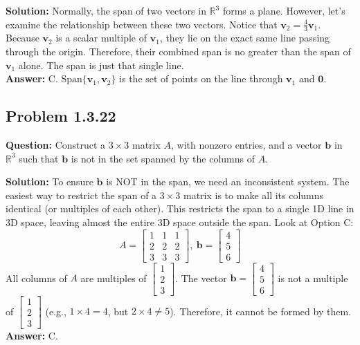 \documentclass[11pt]{article}
\begin{document}
\textbf{Solution:}
Normally, the span of two vectors in $\mathbb{R}^3$ forms a plane. However, let's examine the relationship between these two vectors.
Notice that $\mathbf{v}_2 = \frac{4}{3} \mathbf{v}_1$.
Because $\mathbf{v}_2$ is a scalar multiple of $\mathbf{v}_1$, they lie on the exact same line passing through the origin. Therefore, their combined span is no greater than the span of $\mathbf{v}_1$ alone. The span is just that single line.
\\
\textbf{Answer:} C. $\text{Span}\{\mathbf{v}_1, \mathbf{v}_2\}$ is the set of points on the line through $\mathbf{v}_1$ and $\mathbf{0}$.


\subsection*{Problem 1.3.22}
\textbf{Question:} Construct a $3 \times 3$ matrix $A$, with nonzero entries, and a vector $\mathbf{b}$ in $\mathbb{R}^3$ such that $\mathbf{b}$ is not in the set spanned by the columns of $A$.

\textbf{Solution:}
To ensure $\mathbf{b}$ is NOT in the span, we need an inconsistent system. The easiest way to restrict the span of a $3 \times 3$ matrix is to make all its columns identical (or multiples of each other). This restricts the span to a single 1D line in 3D space, leaving almost the entire 3D space outside the span.
Look at Option C:
\[ A = \begin{bmatrix} 1 & 1 & 1 \\ 2 & 2 & 2 \\ 3 & 3 & 3 \end{bmatrix}, \ \mathbf{b} = \begin{bmatrix} 4 \\ 5 \\ 6 \end{bmatrix} \]
All columns of $A$ are multiples of $\begin{bmatrix} 1 \\ 2 \\ 3 \end{bmatrix}$. The vector $\mathbf{b} = \begin{bmatrix} 4 \\ 5 \\ 6 \end{bmatrix}$ is not a multiple of $\begin{bmatrix} 1 \\ 2 \\ 3 \end{bmatrix}$ (e.g., $1 \times 4 = 4$, but $2 \times 4 \neq 5$). Therefore, it cannot be formed by them.
\\
\textbf{Answer:} C.
\end{document}

